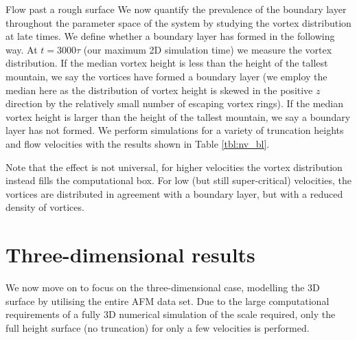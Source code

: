 \begin{chapter}{\label{cha:afm}Flow past a rough surface}
We now quantify the prevalence of the boundary layer throughout the parameter space of the system by studying the vortex distribution at late times. We define whether a boundary layer has formed in the following way. At $t=3000\tau$ (our maximum 2D simulation time) we measure the vortex distribution. If the median vortex height is less than the height of the tallest mountain, we say the vortices have formed a boundary layer (we employ the median here as the distribution of vortex height is skewed in the positive $z$ direction by the relatively small number of escaping vortex rings). If the median vortex height is larger than the height of the tallest mountain, we say a boundary layer has not formed. We perform simulations for a variety of truncation heights and flow velocities with the results shown in Table \ref{tbl:nv_bl}.

Note that the effect is not universal, for higher velocities the vortex distribution instead fills the computational box. For low (but still super-critical) velocities, the vortices are distributed in agreement with a boundary layer, but with a reduced density of vortices.


 
\section{Three-dimensional results}
We now move on to focus on the three-dimensional case, modelling the 3D surface by utilising the entire AFM data set. Due to the large computational requirements of a fully 3D numerical simulation of the scale required, only the full height surface (no truncation) for only a few velocities is performed.


\end{chapter}
